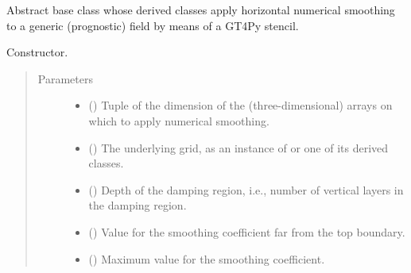 \documentclass[letterpaper,10pt,english]{sphinxmanual}
\begin{document}
\begin{fulllineitems}
\label{\detokenize{api:tasmania.dycore.horizontal_smoothing.HorizontalSmoothing}}
Abstract base class whose derived classes apply horizontal numerical smoothing to a generic (prognostic)
field by means of a GT4Py stencil.

\begin{fulllineitems}
\label{\detokenize{api:tasmania.dycore.horizontal_smoothing.HorizontalSmoothing.__init__}}
Constructor.
\begin{quote}\begin{description}
\item[{Parameters}] \leavevmode\begin{itemize}
\item {} 
 () \textendash{} Tuple of the dimension of the (three-dimensional) arrays on which to apply numerical smoothing.

\item {} 
 () \textendash{} The underlying grid, as an instance of {\hyperref[\detokenize{api:tasmania.grids.grid_xyz.GridXYZ}]{}} or one of its derived classes.

\item {} 
 () \textendash{} Depth of the damping region, i.e., number of vertical layers in the damping region.

\item {} 
 () \textendash{} Value for the smoothing coefficient far from the top boundary.

\item {} 
 () \textendash{} Maximum value for the smoothing coefficient.


\end{itemize}
\end{description}
\end{quote}
\end{fulllineitems}
\end{fulllineitems}
\end{document}
